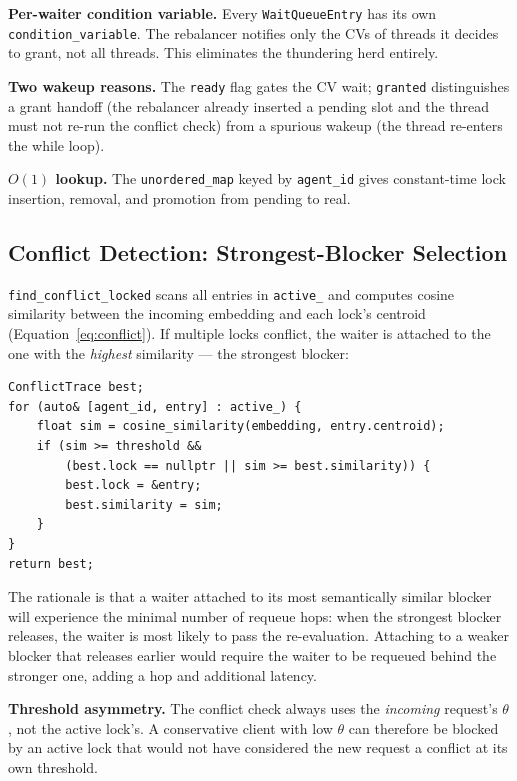 \documentclass[sigconf]{acmart}
\begin{document}
\textbf{Per-waiter condition variable.} Every \texttt{Wait\-Queue\-Entry} has its own
\texttt{condition\_variable}. The rebalancer notifies only the CVs of threads it
decides to grant, not all threads. This eliminates the thundering herd entirely.

\textbf{Two wakeup reasons.} The \texttt{ready} flag gates the CV wait; \texttt{granted}
distinguishes a grant handoff (the rebalancer already inserted a pending slot and the
thread must not re-run the conflict check) from a spurious wakeup (the thread re-enters
the while loop).

\textbf{$O(1)$ lookup.} The \texttt{unordered\_map} keyed by \texttt{agent\_id} gives
constant-time lock insertion, removal, and promotion from pending to real.

\subsection{Conflict Detection: Strongest-Blocker Selection}
\label{sec:conflict}

\texttt{find\_conflict\_locked} scans all entries in \texttt{active\_} and computes
cosine similarity between the incoming embedding and each lock's centroid
(Equation~\ref{eq:conflict}). If multiple locks conflict, the waiter is attached to the
one with the \emph{highest} similarity — the strongest blocker:

\begin{lstlisting}[caption={Strongest-blocker selection}]
ConflictTrace best;
for (auto& [agent_id, entry] : active_) {
    float sim = cosine_similarity(embedding, entry.centroid);
    if (sim >= threshold &&
        (best.lock == nullptr || sim >= best.similarity)) {
        best.lock = &entry;
        best.similarity = sim;
    }
}
return best;
\end{lstlisting}

\noindent The rationale is that a waiter attached to its most semantically similar
blocker will experience the minimal number of requeue hops: when the strongest blocker
releases, the waiter is most likely to pass the re-evaluation. Attaching to a weaker
blocker that releases earlier would require the waiter to be requeued behind the stronger
one, adding a hop and additional latency.

\noindent\textbf{Threshold asymmetry.} The conflict check always uses the
\emph{incoming} request's $\theta$, not the active lock's. A conservative client with
low $\theta$ can therefore be blocked by an active lock that would not have considered
the new request a conflict at its own threshold.
\end{document}
